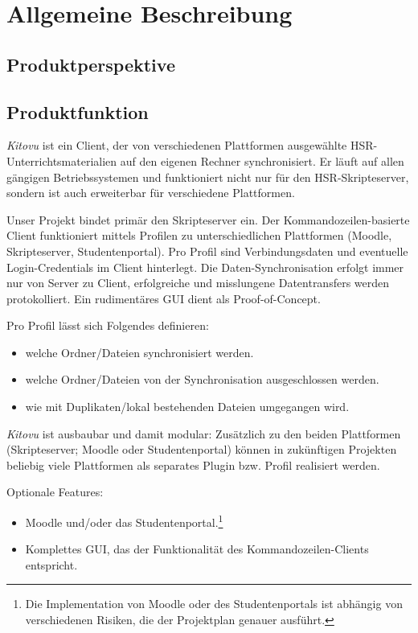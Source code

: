 \documentclass[a4paper]{article}
\let\oldsection\section
\renewcommand\section{\clearpage\oldsection}
\begin{document}
\pagebreak
\section{Allgemeine Beschreibung}

\subsection{Produktperspektive}

\subsection{Produktfunktion}
\emph{Kitovu} ist ein Client, der von verschiedenen Plattformen ausgewählte HSR-Unterrichtsmaterialien auf den eigenen Rechner synchronisiert. Er läuft auf allen gängigen Betriebssystemen und funktioniert nicht nur für den HSR-Skripteserver, sondern ist auch erweiterbar für verschiedene Plattformen.

Unser Projekt bindet primär den Skripteserver ein. Der Kommandozeilen-basierte Client funktioniert mittels Profilen zu unterschiedlichen Plattformen (Moodle, Skripteserver, Studentenportal). Pro Profil sind Verbindungsdaten und eventuelle Login-Credentials im Client hinterlegt. Die Daten-Synchronisation erfolgt immer nur von Server zu Client, erfolgreiche und misslungene Datentransfers werden protokolliert. Ein rudimentäres GUI dient als Proof-of-Concept.

Pro Profil lässt sich Folgendes definieren:

\begin{itemize}
	\item welche Ordner/Dateien synchronisiert werden.
	\item welche Ordner/Dateien von der Synchronisation ausgeschlossen werden.
	\item wie mit Duplikaten/lokal bestehenden Dateien umgegangen wird.
\end{itemize}

\emph{Kitovu} ist ausbaubar und damit modular: Zusätzlich zu den beiden Plattformen (Skripteserver; Moodle oder Studentenportal) können in zukünftigen Projekten beliebig viele Plattformen als separates Plugin bzw. Profil realisiert werden.

Optionale Features:

\begin{itemize}
	\item Moodle und/oder das Studentenportal.\footnote{Die Implementation von Moodle oder des Studentenportals ist abhängig von verschiedenen Risiken, die der Projektplan genauer ausführt.} 
	\item Komplettes GUI, das der Funktionalität des Kommandozeilen-Clients entspricht.
\end{itemize}
\end{document}
